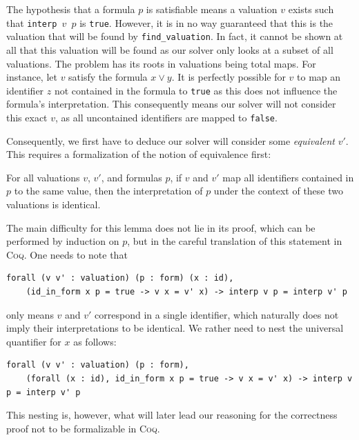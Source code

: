 The hypothesis that a formula $p$ is satisfiable means a valuation $v$ exists such that \texttt{interp $v$ $p$} is \texttt{true}.
However, it is in no way guaranteed that this is the valuation that will be found by \texttt{find\_valuation}.
In fact, it cannot be shown at all that this valuation will be found as our solver only looks at a subset of all valuations.
The problem has its roots in valuations being total maps.
For instance, let $v$ satisfy the formula $x \lor y$.
It is perfectly possible for $v$ to map an identifier $z$ not contained in the formula to \texttt{true} as this does not influence the formula's interpretation.
This consequently means our solver will not consider this exact $v$, as all uncontained identifiers are mapped to \texttt{false}.

Consequently, we first have to deduce our solver will consider some \emph{equivalent} $v'$.
This requires a formalization of the notion of equivalence first:
\begin{lemma}
    For all valuations $v$, $v'$, and formulas $p$, if $v$ and $v'$ map all identifiers contained in $p$ to the same value, then the interpretation of $p$ under the context of these two valuations is identical.
\end{lemma}
The main difficulty for this lemma does not lie in its proof, which can be performed by induction on $p$, but in the careful translation of this statement in \textsc{Coq}.
One needs to note that
\begin{lstlisting}[language=coq]
forall (v v' : valuation) (p : form) (x : id),
    (id_in_form x p = true -> v x = v' x) -> interp v p = interp v' p
\end{lstlisting}
only means $v$ and $v'$ correspond in a single identifier, which naturally does not imply their interpretations to be identical.
We rather need to nest the universal quantifier for $x$ as follows:
\begin{lstlisting}[language=coq]
forall (v v' : valuation) (p : form),
    (forall (x : id), id_in_form x p = true -> v x = v' x) -> interp v p = interp v' p
\end{lstlisting}
This nesting is, however, what will later lead our reasoning for the correctness proof not to be formalizable in \textsc{Coq}.

